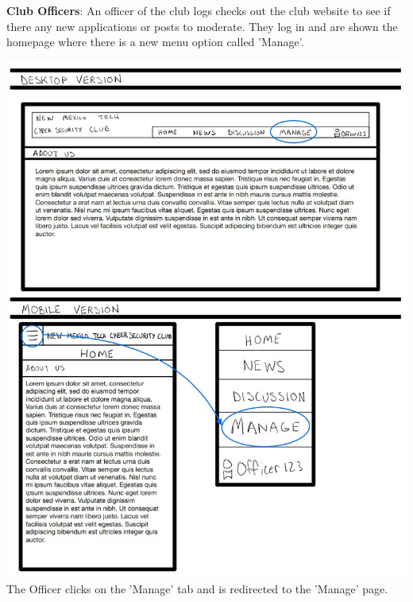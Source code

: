 \documentclass{article}
\begin{document}
\par
\textbf{Club Officers}: An officer of the club logs checks out the club website to see if there any new applications or posts to moderate.  They log in and are shown the homepage where there is a new menu option called 'Manage'. 
\par
\includegraphics[scale=0.60]{officer_1.jpg} The Officer clicks on the 'Manage' tab and is redirected to the 'Manage' page.
\par
\end{document}
